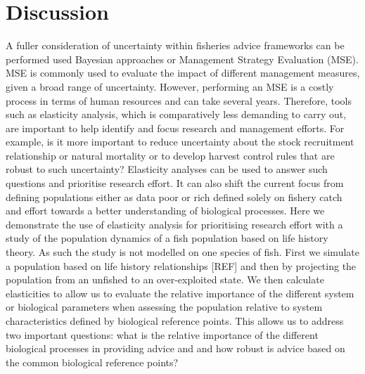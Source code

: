\documentclass[preprint,authoryear,12pt]{elsarticle}
\begin{document}
\section{Discussion}	
A fuller consideration of uncertainty within fisheries advice frameworks can be
performed used Bayesian approaches or Management Strategy Evaluation (MSE). MSE is
commonly used to evaluate the impact of different management measures, given a broad
range of uncertainty. However, performing an MSE is a costly process in terms of human
resources and can take several years. Therefore, tools such as elasticity analysis,
which is comparatively less demanding to carry out, are important to help identify
and focus research and management efforts. For example, is it more important to
reduce uncertainty about the stock recruitment relationship or natural mortality
or to develop harvest control rules that are robust to such uncertainty? Elasticity
analyses can be used to answer such questions and prioritise research effort. It
can also shift the current focus from defining populations either as data poor or
rich defined solely on fishery catch and effort towards a better understanding of
biological processes. Here we demonstrate the use of elasticity analysis for
prioritising research effort with a study of the population dynamics of a fish population
based on life history theory. As such the study is not modelled on one species of
fish. First we simulate a population based on life history relationships [REF] and
then by projecting the population from an unfished to an over-exploited state.
We then calculate elasticities to allow us to evaluate the relative importance of
the different system or biological parameters when assessing the population relative
to system characteristics defined by biological reference points. This allows us
to address two important questions: what is the relative importance of the different
biological processes in providing advice and and how robust is advice based on the
common biological reference points?



\end{document}
